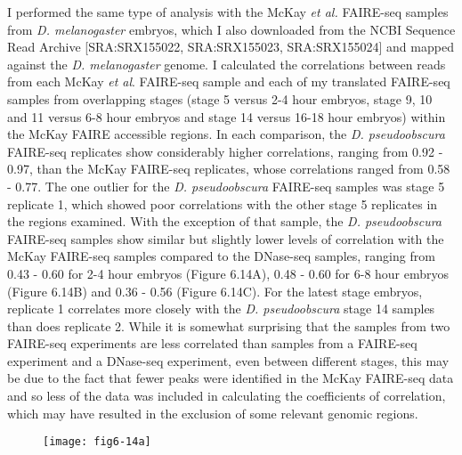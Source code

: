 I performed the same type of analysis with the McKay \emph{et al.} FAIRE-seq samples from \emph{D. melanogaster} embryos, which I also downloaded from the NCBI Sequence Read Archive [SRA:SRX155022, SRA:SRX155023, SRA:SRX155024] and mapped against the \emph{D. melanogaster} genome. I calculated the correlations between reads from each McKay \emph{et al}. FAIRE-seq sample and each of my translated FAIRE-seq samples from overlapping stages (stage 5 versus 2-4 hour embryos, stage 9, 10 and 11 versus 6-8 hour embryos and stage 14 versus 16-18 hour embryos) within the McKay FAIRE accessible regions. In each comparison, the \emph{D. pseudoobscura} FAIRE-seq replicates show considerably higher correlations, ranging from 0.92 - 0.97, than the McKay FAIRE-seq replicates, whose correlations ranged from 0.58 - 0.77. The one outlier for the \emph{D. pseudoobscura} FAIRE-seq samples was stage 5 replicate 1, which showed poor correlations with the other stage 5 replicates in the regions examined. With the exception of that sample, the \emph{D. pseudoobscura} FAIRE-seq samples show similar but slightly lower levels of correlation with the McKay FAIRE-seq samples compared to the DNase-seq samples, ranging from 0.43 - 0.60 for 2-4 hour embryos (Figure 6.14A), 0.48 - 0.60 for 6-8 hour embryos (Figure 6.14B) and 0.36 - 0.56 (Figure 6.14C). For the latest stage embryos, replicate 1 correlates more closely with the \emph{D. pseudoobscura} stage 14 samples than does replicate 2. While it is somewhat surprising that the samples from two FAIRE-seq experiments are less correlated than samples from a FAIRE-seq experiment and a DNase-seq experiment, even between different stages, this may be due to the fact that fewer peaks were identified in the McKay FAIRE-seq data and so less of the data was included in calculating the coefficients of correlation, which may have resulted in the exclusion of some relevant genomic regions.

\begin{figure}[H]
\centering
\texttt{[image: fig6-14a]}
\label{Figure 6.14}
\end{figure}

